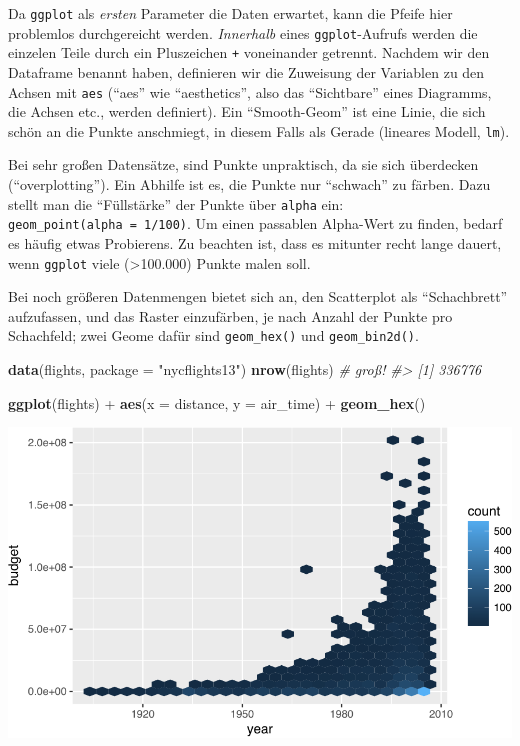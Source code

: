 \documentclass[12pt,]{book}
\newenvironment{Shaded}{\begin{snugshade}}{\end{snugshade}}
\newcommand{\KeywordTok}[1]{\textcolor[rgb]{0.13,0.29,0.53}{\textbf{{#1}}}}
\newcommand{\DataTypeTok}[1]{\textcolor[rgb]{0.13,0.29,0.53}{{#1}}}
\newcommand{\StringTok}[1]{\textcolor[rgb]{0.31,0.60,0.02}{{#1}}}
\newcommand{\CommentTok}[1]{\textcolor[rgb]{0.56,0.35,0.01}{\textit{{#1}}}}
\newcommand{\NormalTok}[1]{{#1}}
\begin{document}
Da \texttt{ggplot} als \emph{ersten} Parameter die Daten erwartet, kann
die Pfeife hier problemlos durchgereicht werden. \emph{Innerhalb} eines
\texttt{ggplot}-Aufrufs werden die einzelen Teile durch ein Pluszeichen
\texttt{+} voneinander getrennt. Nachdem wir den Dataframe benannt
haben, definieren wir die Zuweisung der Variablen zu den Achsen mit
\texttt{aes} (``aes'' wie ``aesthetics'', also das ``Sichtbare'' eines
Diagramms, die Achsen etc., werden definiert). Ein ``Smooth-Geom'' ist
eine Linie, die sich schön an die Punkte anschmiegt, in diesem Falls als
Gerade (lineares Modell, \texttt{lm}).

Bei sehr großen Datensätze, sind Punkte unpraktisch, da sie sich
überdecken (``overplotting''). Ein Abhilfe ist es, die Punkte nur
``schwach'' zu färben. Dazu stellt man die ``Füllstärke'' der Punkte
über \texttt{alpha} ein: \texttt{geom\_point(alpha\ =\ 1/100)}. Um einen
passablen Alpha-Wert zu finden, bedarf es häufig etwas Probierens. Zu
beachten ist, dass es mitunter recht lange dauert, wenn \texttt{ggplot}
viele (\textgreater{}100.000) Punkte malen soll.

Bei noch größeren Datenmengen bietet sich an, den Scatterplot als
``Schachbrett'' aufzufassen, und das Raster einzufärben, je nach Anzahl
der Punkte pro Schachfeld; zwei Geome dafür sind \texttt{geom\_hex()}
und \texttt{geom\_bin2d()}.

\begin{Shaded}
\begin{Highlighting}[]
\KeywordTok{data}\NormalTok{(flights, }\DataTypeTok{package =} \StringTok{"nycflights13"}\NormalTok{)}
\KeywordTok{nrow}\NormalTok{(flights)  }\CommentTok{# groß!}
\CommentTok{#> [1] 336776}

\KeywordTok{ggplot}\NormalTok{(flights) +}
\StringTok{  }\KeywordTok{aes}\NormalTok{(}\DataTypeTok{x =} \NormalTok{distance, }\DataTypeTok{y =} \NormalTok{air_time) +}
\StringTok{  }\KeywordTok{geom_hex}\NormalTok{()}
\end{Highlighting}
\end{Shaded}

\begin{center}\includegraphics[width=0.7\linewidth]{050_Daten_visualisieren_files/figure-latex/flights_hexbin-1} \end{center}
\end{document}
